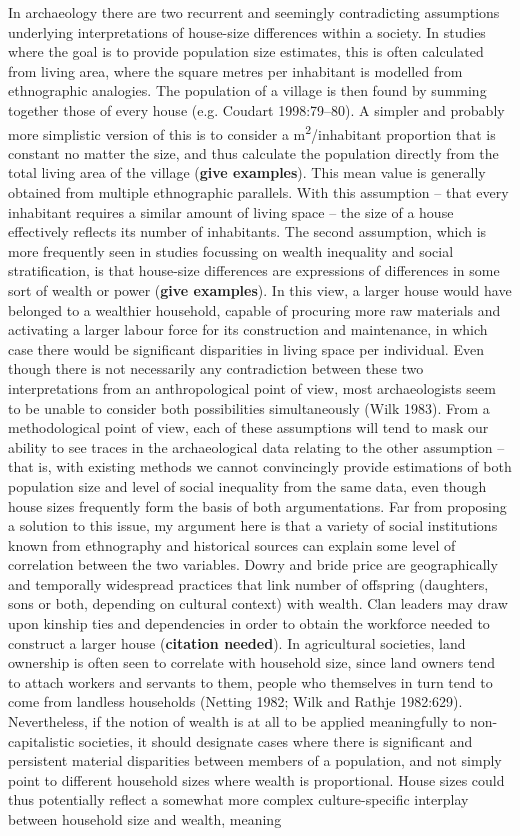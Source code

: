 \documentclass[
  12pt,
]{book}
\begin{document}
In archaeology there are two recurrent and seemingly contradicting assumptions underlying interpretations of house-size differences within a society. In studies where the goal is to provide population size estimates, this is often calculated from living area, where the square metres per inhabitant is modelled from ethnographic analogies. The population of a village is then found by summing together those of every house (e.g. Coudart 1998:79--80). A simpler and probably more simplistic version of this is to consider a m\textsuperscript{2}/inhabitant proportion that is constant no matter the size, and thus calculate the population directly from the total living area of the village (\textbf{give examples}). This mean value is generally obtained from multiple ethnographic parallels. With this assumption -- that every inhabitant requires a similar amount of living space -- the size of a house effectively reflects its number of inhabitants. The second assumption, which is more frequently seen in studies focussing on wealth inequality and social stratification, is that house-size differences are expressions of differences in some sort of wealth or power (\textbf{give examples}). In this view, a larger house would have belonged to a wealthier household, capable of procuring more raw materials and activating a larger labour force for its construction and maintenance, in which case there would be significant disparities in living space per individual. Even though there is not necessarily any contradiction between these two interpretations from an anthropological point of view, most archaeologists seem to be unable to consider both possibilities simultaneously (Wilk 1983). From a methodological point of view, each of these assumptions will tend to mask our ability to see traces in the archaeological data relating to the other assumption -- that is, with existing methods we cannot convincingly provide estimations of both population size and level of social inequality from the same data, even though house sizes frequently form the basis of both argumentations. Far from proposing a solution to this issue, my argument here is that a variety of social institutions known from ethnography and historical sources can explain some level of correlation between the two variables. Dowry and bride price are geographically and temporally widespread practices that link number of offspring (daughters, sons or both, depending on cultural context) with wealth. Clan leaders may draw upon kinship ties and dependencies in order to obtain the workforce needed to construct a larger house (\textbf{citation needed}). In agricultural societies, land ownership is often seen to correlate with household size, since land owners tend to attach workers and servants to them, people who themselves in turn tend to come from landless households (Netting 1982; Wilk and Rathje 1982:629). Nevertheless, if the notion of wealth is at all to be applied meaningfully to non-capitalistic societies, it should designate cases where there is significant and persistent material disparities between members of a population, and not simply point to different household sizes where wealth is proportional. House sizes could thus potentially reflect a somewhat more complex culture-specific interplay between household size and wealth, meaning 
\end{document}
